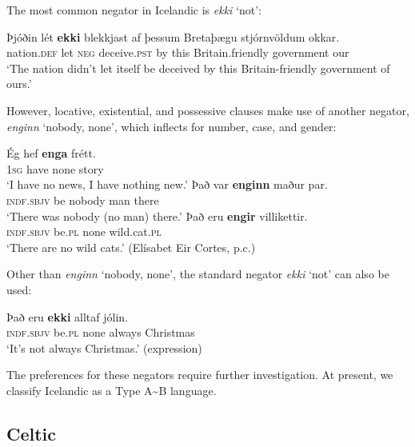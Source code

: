 \documentclass[output=paper,colorlinks,citecolor=brown]{langscibook}
\begin{document}
\begin{paperappendix}
\begin{unindented}

The most common negator in Icelandic is \textit{ekki} `not': 
%
\begin{exe}\ex \gll Þjóðin lét   \textbf{ekki}   blekkjast   af   þessum
Bretaþægu stjórnvöldum   okkar. \\
nation.\textsc{def} let \textsc{neg} deceive.\textsc{pst} by this   
Britain.friendly   government our \\
    \glt `The nation didn't let itself be deceived by this Britain-friendly government of ours.' \citep[286]{Wood2012}
    \end{exe}

However, locative, existential, and possessive clauses make use of another negator, \textit{enginn} `nobody, none', which inflects for number, case, and gender: 
%
\begin{exe}\ex \gll Ég   hef    \textbf{enga} frétt. \\
\textsc{1sg} have none story \\
    \glt `I have no news, I have nothing new.' \citep[62]{Bjarnason1998}
\ex \gll Það var \textbf{enginn}  maður par. \\
\textsc{indf.sbjv} be   nobody man    there \\
    \glt `There was nobody (no man) there.' \citep[123]{Einarsson1949} 
\ex \gll Það eru    \textbf{engir} villikettir. \\
\textsc{indf.sbjv} be.\textsc{pl} none   wild.cat.\textsc{pl} \\
    \glt `There are no wild cats.' (Elísabet Eir Cortes, p.c.)
    \end{exe}

Other than \textit{enginn} `nobody, none', the standard negator \textit{ekki} `not' can also be used:
%
\begin{exe}\ex \gll Það eru \textbf{ekki} alltaf    jólin. \\
\textsc{indf.sbjv} be.\textsc{pl} none always Christmas \\
    \glt `It's not always Christmas.' (expression)
    \end{exe}

The preferences for these negators require further investigation.  At present, we classify Icelandic as a Type A{\textasciitilde}B language. 

\subsection{Celtic}%


\end{unindented}
\end{paperappendix}
\end{document}
